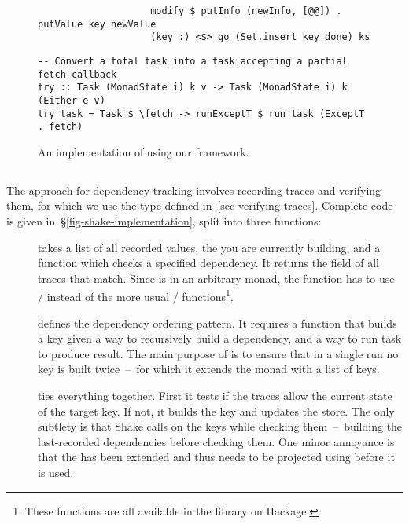 \begin{figure}
\begin{verbatim}
                    modify $ putInfo (newInfo, [@@]) . putValue key newValue
                    (key :) <$> go (Set.insert key done) ks
\end{verbatim}
\vspace{0mm}
\begin{verbatim}
-- Convert a total task into a task accepting a partial fetch callback
try :: Task (MonadState i) k v -> Task (MonadState i) k (Either e v)
try task = Task $ \fetch -> runExceptT $ run task (ExceptT . fetch)
\end{verbatim}
\vspace{-2mm}
\caption{An implementation of \Excel using our framework.}\label{fig-excel-implementation}
\vspace{-4mm}
\end{figure}

\vspace{-2mm}
\subsection{\Shake}\label{sec-implementation-shake}
\vspace{-1mm}

The \Shake approach for dependency tracking involves recording traces and
verifying them, for which we use the  type defined
in~\ref{sec-verifying-traces}. Complete code is given
in~\S\ref{fig-shake-implementation}, split into three functions:

\begin{description}
\item[] takes a list of all recorded  values, the
     you are currently building, and a function  which checks
    a specified dependency. It returns the  field of all traces that
    match. Since  is in an arbitrary monad, the function has to use
    /\hs{&&^} instead of the more usual /\hs{&&}
    functions\footnote{These functions are all available in the 
    library on Hackage.}.
\item[] defines the dependency ordering pattern. It requires a
     function that builds a key given a way to recursively build a
    dependency, and a way to run task to produce result. The main purpose of
     is to ensure that in a single run no key is built twice~--~for
    which it extends the  monad with a list of  keys.
\item[] ties everything together. First it tests if the traces allow
the current state of the target key. If not, it builds the key and updates the
store. The only subtlety is that Shake calls  on the keys while
checking them~--~building the last-recorded dependencies before checking them.
One minor annoyance is that the  has been extended and thus needs to
be projected using  before it is used.
\end{description}

